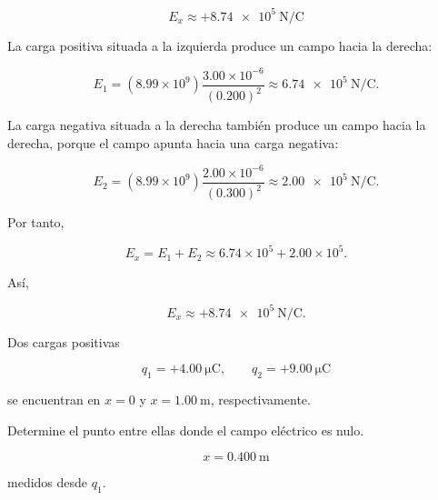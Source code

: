 \begin{respuesta}

\[
\boxed{E_x\approx+\SI{8.74e5}{\newton\per\coulomb}}
\]

\end{respuesta}

\begin{explicacion}

La carga positiva situada a la izquierda produce un campo hacia la derecha:

\[
E_1=(8.99\times10^9)\frac{3.00\times10^{-6}}{(0.200)^2}
\approx\SI{6.74e5}{\newton\per\coulomb}.
\]

La carga negativa situada a la derecha también produce un campo hacia la derecha, porque el campo apunta hacia una carga negativa:

\[
E_2=(8.99\times10^9)\frac{2.00\times10^{-6}}{(0.300)^2}
\approx\SI{2.00e5}{\newton\per\coulomb}.
\]

Por tanto,

\[
E_x=E_1+E_2
\approx6.74\times10^5+2.00\times10^5.
\]

Así,

\[
\boxed{E_x\approx+\SI{8.74e5}{\newton\per\coulomb}}.
\]

\end{explicacion}


\begin{ejercicio}

Dos cargas positivas

\[
q_1=+\SI{4.00}{\micro\coulomb},
\qquad
q_2=+\SI{9.00}{\micro\coulomb}
\]

se encuentran en \(x=0\) y \(x=\SI{1.00}{\metre}\), respectivamente.

Determine el punto entre ellas donde el campo eléctrico es nulo.

\end{ejercicio}

\begin{respuesta}

\[
\boxed{x=\SI{0.400}{\metre}}
\]

medidos desde \(q_1\).

\end{respuesta}

